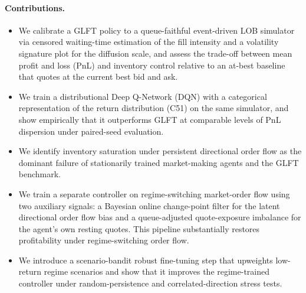 \documentclass[11pt,a4paper]{article}
\begin{document}
\paragraph{Contributions.}
\begin{itemize}[leftmargin=1.2em,itemsep=1pt,topsep=2pt]
\item We calibrate a GLFT policy to a queue-faithful event-driven
  LOB simulator via censored waiting-time estimation of the fill
  intensity and a volatility signature plot for the diffusion scale,
  and assess the trade-off between mean profit and loss (PnL) and inventory control
  relative to an at-best baseline that quotes at the current best bid
  and ask.
\item We train a distributional Deep Q-Network (DQN) with a
  categorical representation of the return distribution (C51) on the same simulator, and
  show empirically that it outperforms GLFT at comparable levels of
  PnL dispersion under paired-seed evaluation.
\item We identify inventory saturation under persistent directional
  order flow as the dominant failure of stationarily trained
  market-making agents and the GLFT benchmark.
\item We train a separate controller on
 regime-switching market-order flow using two
  auxiliary signals: a Bayesian online change-point filter for the
  latent directional order flow bias and a queue-adjusted
  quote-exposure imbalance for the agent's own resting quotes.  This
  pipeline substantially restores profitability under
  regime-switching order flow.
\item We introduce a scenario-bandit robust fine-tuning step that
  upweights low-return regime scenarios and show that it improves the
  regime-trained controller under random-persistence and
  correlated-direction stress tests.
\end{itemize}
\end{document}
